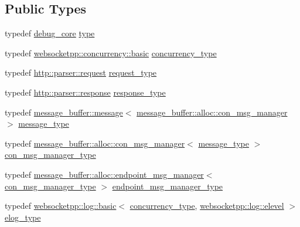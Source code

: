 \subsection*{Public Types}
\begin{DoxyCompactItemize}
\item 
typedef \hyperlink{structwebsocketpp_1_1config_1_1debug__core}{debug\+\_\+core} \hyperlink{structwebsocketpp_1_1config_1_1debug__core_a5c32a974103fef0bad45f0f66bf20e8e}{type}
\item 
typedef \hyperlink{classwebsocketpp_1_1concurrency_1_1basic}{websocketpp\+::concurrency\+::basic} \hyperlink{structwebsocketpp_1_1config_1_1debug__core_aada73b9183fc032c25178870dbb4d83d}{concurrency\+\_\+type}
\item 
typedef \hyperlink{classwebsocketpp_1_1http_1_1parser_1_1request}{http\+::parser\+::request} \hyperlink{structwebsocketpp_1_1config_1_1debug__core_a597de872d5a5b6e9bd2fa1af18ccbbc6}{request\+\_\+type}
\item 
typedef \hyperlink{classwebsocketpp_1_1http_1_1parser_1_1response}{http\+::parser\+::response} \hyperlink{structwebsocketpp_1_1config_1_1debug__core_aa11255cb23f43afb8884bc464aa5c572}{response\+\_\+type}
\item 
typedef \hyperlink{classwebsocketpp_1_1message__buffer_1_1message}{message\+\_\+buffer\+::message}$<$ \hyperlink{classwebsocketpp_1_1message__buffer_1_1alloc_1_1con__msg__manager}{message\+\_\+buffer\+::alloc\+::con\+\_\+msg\+\_\+manager} $>$ \hyperlink{structwebsocketpp_1_1config_1_1debug__core_ac17c81ad59c265eed87e3e25944c9fbf}{message\+\_\+type}
\item 
typedef \hyperlink{classwebsocketpp_1_1message__buffer_1_1alloc_1_1con__msg__manager}{message\+\_\+buffer\+::alloc\+::con\+\_\+msg\+\_\+manager}$<$ \hyperlink{structwebsocketpp_1_1config_1_1debug__core_ac17c81ad59c265eed87e3e25944c9fbf}{message\+\_\+type} $>$ \hyperlink{structwebsocketpp_1_1config_1_1debug__core_a7054f79ccb00e2269e3c9fa1061126ac}{con\+\_\+msg\+\_\+manager\+\_\+type}
\item 
typedef \hyperlink{classwebsocketpp_1_1message__buffer_1_1alloc_1_1endpoint__msg__manager}{message\+\_\+buffer\+::alloc\+::endpoint\+\_\+msg\+\_\+manager}$<$ \hyperlink{structwebsocketpp_1_1config_1_1debug__core_a7054f79ccb00e2269e3c9fa1061126ac}{con\+\_\+msg\+\_\+manager\+\_\+type} $>$ \hyperlink{structwebsocketpp_1_1config_1_1debug__core_a02b1cc8ce11213011104049aeba57866}{endpoint\+\_\+msg\+\_\+manager\+\_\+type}
\item 
typedef \hyperlink{classwebsocketpp_1_1log_1_1basic}{websocketpp\+::log\+::basic}$<$ \hyperlink{structwebsocketpp_1_1config_1_1debug__core_aada73b9183fc032c25178870dbb4d83d}{concurrency\+\_\+type}, \hyperlink{structwebsocketpp_1_1log_1_1elevel}{websocketpp\+::log\+::elevel} $>$ \hyperlink{structwebsocketpp_1_1config_1_1debug__core_acfa1ded7f80d6a7276b0ec3fd0859fc3}{elog\+\_\+type}

\end{DoxyCompactItemize}
